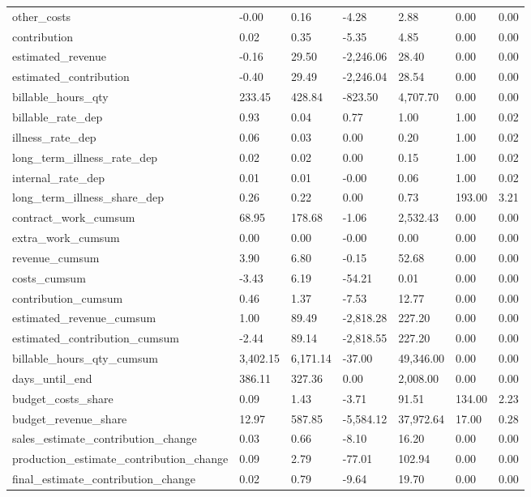 \begin{landscape}
\begin{longtable}[h!]{lllllll}
other_costs & -0.00 & 0.16 & -4.28 & 2.88 & 0.00 & 0.00 \\
contribution & 0.02 & 0.35 & -5.35 & 4.85 & 0.00 & 0.00 \\
estimated_revenue & -0.16 & 29.50 & -2,246.06 & 28.40 & 0.00 & 0.00 \\
estimated_contribution & -0.40 & 29.49 & -2,246.04 & 28.54 & 0.00 & 0.00 \\
billable_hours_qty & 233.45 & 428.84 & -823.50 & 4,707.70 & 0.00 & 0.00 \\
billable_rate_dep & 0.93 & 0.04 & 0.77 & 1.00 & 1.00 & 0.02 \\
illness_rate_dep & 0.06 & 0.03 & 0.00 & 0.20 & 1.00 & 0.02 \\
long_term_illness_rate_dep & 0.02 & 0.02 & 0.00 & 0.15 & 1.00 & 0.02 \\
internal_rate_dep & 0.01 & 0.01 & -0.00 & 0.06 & 1.00 & 0.02 \\
long_term_illness_share_dep & 0.26 & 0.22 & 0.00 & 0.73 & 193.00 & 3.21 \\
contract_work_cumsum & 68.95 & 178.68 & -1.06 & 2,532.43 & 0.00 & 0.00 \\
extra_work_cumsum & 0.00 & 0.00 & -0.00 & 0.00 & 0.00 & 0.00 \\
revenue_cumsum & 3.90 & 6.80 & -0.15 & 52.68 & 0.00 & 0.00 \\
costs_cumsum & -3.43 & 6.19 & -54.21 & 0.01 & 0.00 & 0.00 \\
contribution_cumsum & 0.46 & 1.37 & -7.53 & 12.77 & 0.00 & 0.00 \\
estimated_revenue_cumsum & 1.00 & 89.49 & -2,818.28 & 227.20 & 0.00 & 0.00 \\
estimated_contribution_cumsum & -2.44 & 89.14 & -2,818.55 & 227.20 & 0.00 & 0.00 \\
billable_hours_qty_cumsum & 3,402.15 & 6,171.14 & -37.00 & 49,346.00 & 0.00 & 0.00 \\
days_until_end & 386.11 & 327.36 & 0.00 & 2,008.00 & 0.00 & 0.00 \\
budget_costs_share & 0.09 & 1.43 & -3.71 & 91.51 & 134.00 & 2.23 \\
budget_revenue_share & 12.97 & 587.85 & -5,584.12 & 37,972.64 & 17.00 & 0.28 \\
sales_estimate_contribution_change & 0.03 & 0.66 & -8.10 & 16.20 & 0.00 & 0.00 \\
production_estimate_contribution_change & 0.09 & 2.79 & -77.01 & 102.94 & 0.00 & 0.00 \\
final_estimate_contribution_change & 0.02 & 0.79 & -9.64 & 19.70 & 0.00 & 0.00 \\

\end{longtable}
\end{landscape}
